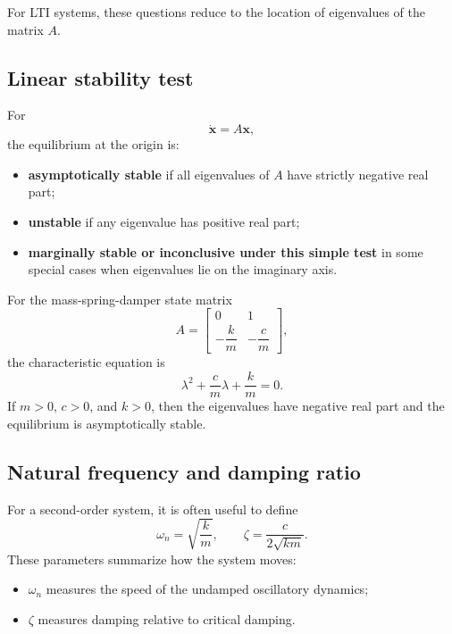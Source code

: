 \documentclass[11pt]{article}
\newcommand{\vect}[1]{\boldsymbol{#1}}
\newcommand{\state}{\vect{x}}
\begin{document}
For LTI systems, these questions reduce to the location of eigenvalues of the matrix $A$.

\subsection{Linear stability test}

For
\begin{equation}
\dot{\state}=A\state,
\end{equation}
the equilibrium at the origin is:
\begin{itemize}[leftmargin=1.4em]
  \item \textbf{asymptotically stable} if all eigenvalues of $A$ have strictly negative real part;
  \item \textbf{unstable} if any eigenvalue has positive real part;
  \item \textbf{marginally stable or inconclusive under this simple test} in some special cases when eigenvalues lie on the imaginary axis.
\end{itemize}

For the mass-spring-damper state matrix
\begin{equation}
A=
\begin{bmatrix}
0 & 1 \\
-\dfrac{k}{m} & -\dfrac{c}{m}
\end{bmatrix},
\end{equation}
the characteristic equation is
\begin{equation}
\lambda^2+\frac{c}{m}\lambda+\frac{k}{m}=0.
\end{equation}
If $m>0$, $c>0$, and $k>0$, then the eigenvalues have negative real part and the equilibrium is asymptotically stable.

\subsection{Natural frequency and damping ratio}

For a second-order system, it is often useful to define
\begin{equation}
\omega_n = \sqrt{\frac{k}{m}},
\qquad
\zeta = \frac{c}{2\sqrt{km}}.
\end{equation}
These parameters summarize how the system moves:
\begin{itemize}[leftmargin=1.4em]
  \item $\omega_n$ measures the speed of the undamped oscillatory dynamics;
  \item $\zeta$ measures damping relative to critical damping.
\end{itemize}
\end{document}
